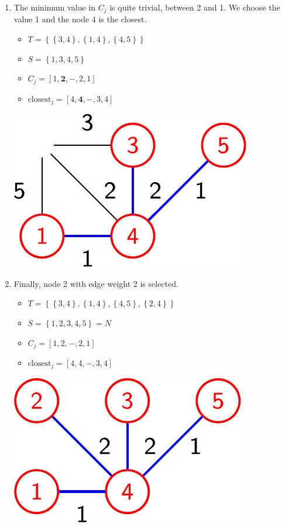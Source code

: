 \begin{examplebox}
\begin{enumerate}
        \item The minimum value in $C_{j}$ is quite trivial, between 2 and 1. We choose the value 1 and the node $4$ is the closest.
        \begin{itemize}
            \item $T = \left\{\left\{3,4\right\}, \left\{1,4\right\}, \left\{4,5\right\}\right\}$
            \item $S = \left\{1, 3, 4, 5\right\}$
            \item $C_{j} = \left[1, \mathbf{2}, -, 2, 1\right]$
            \item $\text{closest}_{j} = \left[4, \mathbf{4}, -, 3, 4\right]$
        \end{itemize}
        \begin{center}
            \includegraphics[width=.3\textwidth]{img/prims-alg-5-imp.pdf}
        \end{center}

        \item Finally, node 2 with edge weight 2 is selected.
        \begin{itemize}
            \item $T = \left\{\left\{3,4\right\}, \left\{1,4\right\}, \left\{4,5\right\}, \left\{2,4\right\}\right\}$
            \item $S = \left\{1, 2, 3, 4, 5\right\} = N$
            \item $C_{j} = \left[1, 2, -, 2, 1\right]$
            \item $\text{closest}_{j} = \left[4, 4, -, 3, 4\right]$
        \end{itemize}
        \begin{center}
            \includegraphics[width=.3\textwidth]{img/prims-alg-6-imp.pdf}
        \end{center}
    \end{enumerate}
\end{examplebox}

